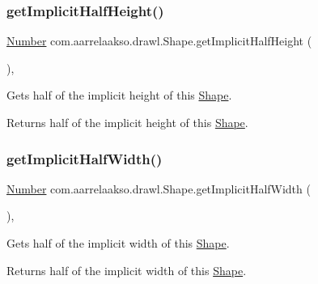\subsubsection{\texorpdfstring{get\+Implicit\+Half\+Height()}{getImplicitHalfHeight()}}
{\footnotesize\ttfamily \hyperlink{interfacecom_1_1aarrelaakso_1_1drawl_1_1_number}{Number} com.\+aarrelaakso.\+drawl.\+Shape.\+get\+Implicit\+Half\+Height (\begin{DoxyParamCaption}{ }\end{DoxyParamCaption})\hspace{0.3cm}{\ttfamily [protected]}, {\ttfamily [inherited]}}



Gets half of the implicit height of this \hyperlink{classcom_1_1aarrelaakso_1_1drawl_1_1_shape}{Shape}. 

\begin{DoxyReturn}{Returns}
half of the implicit height of this \hyperlink{classcom_1_1aarrelaakso_1_1drawl_1_1_shape}{Shape}. 
\end{DoxyReturn}
\mbox{\label{classcom_1_1aarrelaakso_1_1drawl_1_1_shape_a02d73887a309bcd1178b142ad0c7edd9}} 
\subsubsection{\texorpdfstring{get\+Implicit\+Half\+Width()}{getImplicitHalfWidth()}}
{\footnotesize\ttfamily \hyperlink{interfacecom_1_1aarrelaakso_1_1drawl_1_1_number}{Number} com.\+aarrelaakso.\+drawl.\+Shape.\+get\+Implicit\+Half\+Width (\begin{DoxyParamCaption}{ }\end{DoxyParamCaption})\hspace{0.3cm}{\ttfamily [protected]}, {\ttfamily [inherited]}}



Gets half of the implicit width of this \hyperlink{classcom_1_1aarrelaakso_1_1drawl_1_1_shape}{Shape}. 

\begin{DoxyReturn}{Returns}
half of the implicit width of this \hyperlink{classcom_1_1aarrelaakso_1_1drawl_1_1_shape}{Shape}. 
\end{DoxyReturn}
\mbox{\label{classcom_1_1aarrelaakso_1_1drawl_1_1_shape_a3b0ad73b41fe8c9ae66d20f7fc1de7c9}} 

